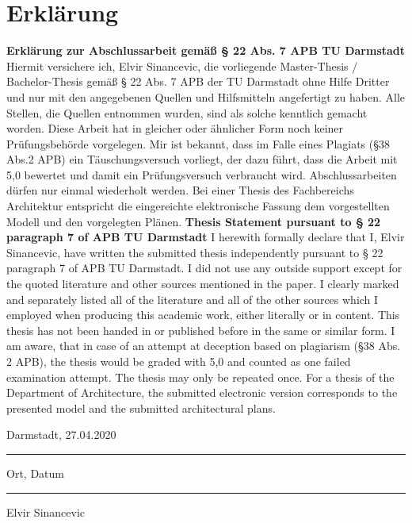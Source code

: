 \chapter*{Erklärung}\label{cha:Erklärung}
\textbf{Erklärung zur Abschlussarbeit gemäß § 22 Abs. 7 APB TU Darmstadt}
\newline\newline
Hiermit versichere ich, Elvir Sinancevic, die vorliegende Master-Thesis / Bachelor-Thesis gemäß § 22 Abs. 7 APB der TU Darmstadt ohne Hilfe Dritter und nur mit den angegebenen Quellen und Hilfsmitteln angefertigt zu haben. Alle Stellen, die Quellen entnommen wurden, sind als solche kenntlich gemacht worden. Diese Arbeit hat in gleicher oder ähnlicher Form noch keiner Prüfungsbehörde vorgelegen. 
\newline\newline
Mir ist bekannt, dass im Falle eines Plagiats (§38 Abs.2 APB) ein Täuschungsversuch vorliegt, der dazu führt, dass die Arbeit mit 5,0 bewertet und damit ein Prüfungsversuch verbraucht wird. Abschlussarbeiten dürfen nur einmal wiederholt werden.
\newline\newline
Bei einer Thesis des Fachbereichs Architektur entspricht die eingereichte elektronische Fassung dem vorgestellten Modell und den vorgelegten Plänen.
\newline\newline
\newline\newline
\textbf{Thesis Statement pursuant to § 22 paragraph 7 of APB TU Darmstadt}
\newline\newline
I herewith formally declare that I, Elvir Sinancevic, have written the submitted thesis independently pursuant to § 22 paragraph 7 of APB TU Darmstadt. I did not use any outside support except for the quoted literature and other sources mentioned in the paper. I clearly marked and separately listed all of the literature and all of the other sources which I employed when producing this academic work, either literally or in content. This thesis has not been handed in or published before in the same or similar form.
\newline\newline
I am aware, that in case of an attempt at deception based on plagiarism (§38 Abs. 2 APB), the thesis would be graded with 5,0 and counted as one failed examination attempt. The thesis may only be repeated once.
\newline\newline
For a thesis of the Department of Architecture, the submitted electronic version corresponds to the presented model and the submitted architectural plans.
\newline\newline
\newline\newline
\parbox{5cm}{\centering Darmstadt, 27.04.2020\hrule
	\strut \centering\footnotesize Ort, Datum} \hfill\parbox{5cm}{\hrule
	\strut \centering\footnotesize Elvir Sinancevic}